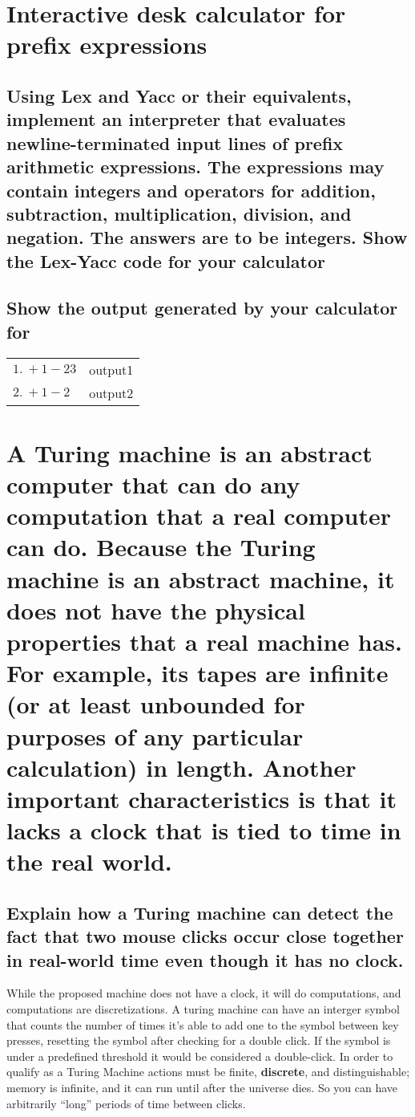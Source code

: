 \documentclass{article}
\begin{document}
\newpage
\section[Problem 4]{Interactive desk calculator for prefix expressions}
\subsection[Lex/Yac Interpreter]{Using Lex and Yacc or their equivalents, implement an interpreter that evaluates newline-terminated input lines of prefix arithmetic expressions. The expressions may contain integers and operators for addition, subtraction, multiplication, division, and negation. The answers are to be integers. Show the Lex-Yacc code for your calculator}
\subsection[Calculator Output]{Show the output generated by your calculator for}

\begin{tabular}{ll}
\indent $1.\ + 1 - 2 3$ & output1 \\
\indent $2.\ + 1 - 2$ & output2 \\
\end{tabular}


\newpage
\section[Problem 5]{A Turing machine is an abstract computer that can do any computation that a real computer can do. Because the Turing machine is an abstract machine, it does not have the physical properties that a real machine has. For example, its tapes are infinite (or at least unbounded for purposes of any particular calculation) in length. Another important characteristics is that it lacks a clock that is tied to time in the real world.}
\subsection[Turing Machine Double Click]{Explain how a Turing machine can detect the fact that two mouse clicks occur close together in real-world time even though it has no clock.}
While the proposed machine does not have a clock, it will do computations, and computations are discretizations. A turing machine can have an interger symbol that counts the number of times it's able to add one to the symbol between key presses, resetting the symbol after checking for a double click. If the symbol is under a predefined threshold it would be considered a double-click. In order to qualify as a Turing Machine actions must be finite, \textbf{discrete}, and distinguishable; memory is infinite, and it can run until after the universe dies. So you can have arbitrarily ``long'' periods of time between clicks.
\end{document}
